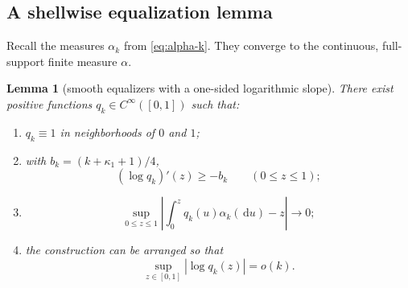 \documentclass[11pt,oneside]{article}
\newtheorem{lemma}[theorem]{Lemma}
\theoremstyle{definition}
\theoremstyle{remark}
\newcommand{\dd}{\,\mathrm d}
\newcommand{\abs}[1]{\left|#1\right|}
\begin{document}
\subsection{A shellwise equalization lemma}

Recall the measures \(\alpha_k\) from \eqref{eq:alpha-k}.  They converge to
the continuous, full-support finite measure \(\alpha\).

\begin{lemma}[smooth equalizers with a one-sided logarithmic slope]
\label{lem:equalizers}
There exist positive functions \(q_k\in C^\infty([0,1])\) such that:
\begin{enumerate}
\item \(q_k\equiv1\) in neighborhoods of \(0\) and \(1\);
\item with \(b_k=(k+\kappa_1+1)/4\),
\begin{equation}
 (\log q_k)'(z)\ge-b_k\qquad(0\le z\le1);
 \label{eq:q-slope}
\end{equation}
\item
\begin{equation}
 \sup_{0\le z\le1}
 \abs{\int_0^zq_k(u)\alpha_k(\dd u)-z}
 \longrightarrow0;
 \label{eq:q-equalize}
\end{equation}
\item the construction can be arranged so that
\begin{equation}
 \sup_{z\in[0,1]}|\log q_k(z)|=o(k).
 \label{eq:q-sublinear}
\end{equation}
\end{enumerate}
\end{lemma}
\end{document}
